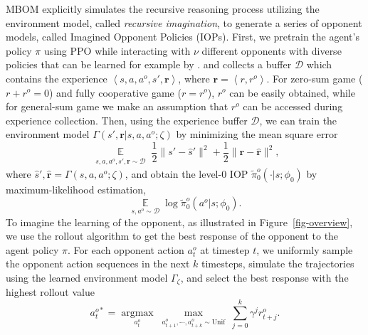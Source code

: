 \documentclass{article}
\begin{document}
MBOM explicitly simulates the recursive reasoning process utilizing the environment model, called \textit{recursive imagination}, to generate a series of opponent models, called Imagined Opponent Policies (IOPs). 
First, we pretrain the agent's policy $\pi$ using PPO \citep{schulman2017proximal} while interacting with $\nu$ different opponents with diverse policies that can be learned for example by \citep{tang2021discovering}.
and collects a buffer $\mathcal{D}$ which contains the experience $\left<s, a, a^o, s' , \bm{r}\right>$, where $\bm{r} = \left<r,r^o\right>$. 
For zero-sum game ($r+r^o=0$) and fully cooperative game ($r=r^o$), $r^o$ can be easily obtained, while for general-sum game we make an assumption that $r^o$ can be accessed during experience collection. 
Then, using the experience buffer $\mathcal{D}$, we can train the environment model $\Gamma(s', \bm{r} | s, a, a^o;\zeta)$ by minimizing the mean square error
\begin{equation}
\mathop{\mathbb{E}}\limits_{\substack{s, a, a^o, s' ,\bm{r} \sim \mathcal{D}}} \frac{1}{2}\|s' - \hat{s}'\|^2 +\frac{1}{2}\|\bm{r} - \hat{\bm{r}}\|^2,
\end{equation}
where $\hat{s}',\hat{\bm{r}} = \Gamma(s, a, a^o;\zeta)$, and obtain the level-0 IOP $\tilde{\pi}^o_0(\cdot|s;\phi_0)$ by maximum-likelihood estimation,
\begin{equation}
\mathop{\mathbb{E}}\limits_{s, a^o \sim \mathcal{D}} \log \tilde{\pi}^o_0(a^o|s;\phi_0).
\end{equation}
%
To imagine the learning of the opponent, as illustrated in Figure~\ref{fig-overview}, we use the rollout algorithm \citep{Tesauro1996On} to get the best response of the opponent to the agent policy $\pi$. For each opponent action $a^o_t$ at timestep $t$, we uniformly sample the opponent action sequences in the next $k$ timesteps, simulate the trajectories using the learned environment model $\Gamma_\zeta$, and select the best response with the highest rollout value
\begin{equation}
\label{eq:best}
a^{o *}_t = \mathop{\operatorname{argmax}}\limits_{a_t^{o}}\max\limits_{\substack{a_{t+1}^o,\cdots, a_{t+k}^o \sim \text{Unif}}} \sum_{j = 0}^{k}\gamma^{j} {r}_{t+j}^{o}.
\end{equation}
\end{document}
